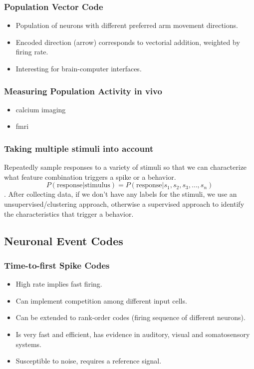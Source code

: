\documentclass[main]{subfiles}
\begin{document}
\subsubsection{Population Vector Code}
\begin{itemize}[noitemsep,nolistsep]
	\item Population of neurons with different preferred arm movement directions.
	\item Encoded direction (arrow) corresponds to vectorial addition, weighted by firing rate.
	\item Interesting for brain-computer interfaces.
\end{itemize}

\subsubsection{Measuring Population Activity in vivo}
\begin{itemize}
\item calcium imaging
\item fmri
\end{itemize}

\subsubsection{Taking multiple stimuli into account}
Repeatedly sample responses to a variety of stimuli so that we can characterize what feature combination triggers a spike or a behavior.
\[ P(\text{response} | \text{stimulus}) = P(\text{response} | s_1, s_2, s_3, \dots , s_n ) \].
After collecting data, if we don't have any labels for the stimuli, we use an unsupervised/clustering approach, otherwise a supervised approach to identify the characteristics that trigger a behavior.

\subsection{Neuronal Event Codes}
\subsubsection{Time-to-first Spike Codes}
\begin{itemize}[noitemsep,nolistsep]
	\item High rate implies fast firing.
	\item Can implement competition among different input cells.
	\item Can be extended to rank-order codes (firing sequence of different neurons).
	\item Is very fast and efficient, has evidence in auditory, visual and somatosensory systems.
	\item Susceptible to noise, requires a reference signal.
\end{itemize}
\end{document}
